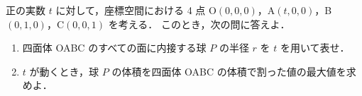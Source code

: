 \documentclass[../../main.tex]{subfiles}
\begin{document}
正の実数 $t$ に対して，座標空間における 4 点 O$(0,0,0)$，A$(t,0,0)$，B$(0,1,0)$，C$(0,0,1)$ を考える．
このとき，次の問に答えよ．
\begin{enumerate}
  \item 四面体 OABC のすべての面に内接する球 $P$ の半径 $r$ を $t$ を用いて表せ．
  \item $t$ が動くとき，球 $P$ の体積を四面体 OABC の体積で割った値の最大値を求めよ．
\end{enumerate}
\end{document}

